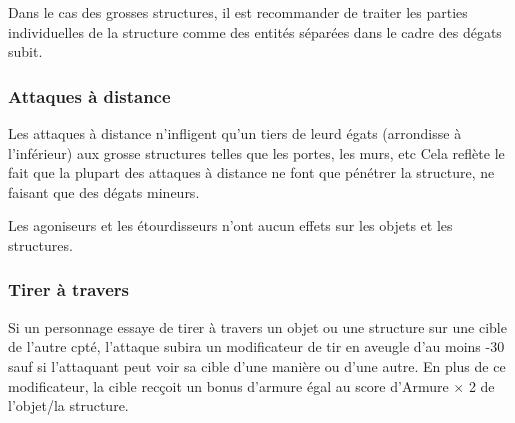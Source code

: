 Dans le cas des grosses structures, il est recommander de traiter les parties individuelles de la structure comme des entités séparées dans le cadre des dégats subit. 

\subsubsection{Attaques à distance} 

Les attaques à distance n'infligent qu'un tiers de leurd égats (arrondisse à l'inférieur) aux grosse structures telles que les portes, les murs, etc Cela reflète le fait que la plupart des attaques à distance ne font que pénétrer la structure, ne faisant que des dégats mineurs. 

Les agoniseurs et les étourdisseurs n'ont aucun effets sur les objets et les structures. 

\subsubsection{Tirer à travers} 

Si un personnage essaye de tirer à travers un objet ou une structure sur une cible de l'autre cpté, l'attaque subira un modificateur de tir en aveugle d'au moins -30 sauf si l'attaquant peut voir sa cible d'une manière ou d'une autre. En plus de ce modificateur, la cible recçoit un bonus d'armure égal au score d'Armure $\times$ 2 de l'objet/la structure. 

